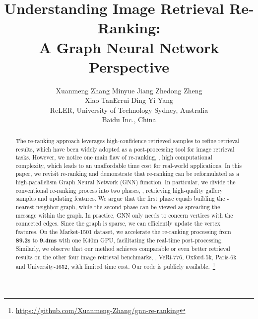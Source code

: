 \documentclass[10pt,twocolumn,letterpaper]{article}
\begin{document}
\title{Understanding Image Retrieval Re-Ranking: \\ A Graph Neural Network Perspective}



\author{
Xuanmeng Zhang \quad  Minyue Jiang \quad  Zhedong Zheng  \\
 Xiao Tan\quad Errui Ding \quad Yi Yang \quad \\ 
ReLER, University of Technology Sydney, Australia\\  
 Baidu Inc., China  \\
   


}

\maketitle


\begin{abstract}
The re-ranking approach leverages high-confidence retrieved samples to refine retrieval results, which have been widely adopted as a post-processing tool for image retrieval tasks. However, we notice one main flaw of re-ranking, \ie, high computational complexity, which leads to an unaffordable time cost for real-world applications. In this paper, we revisit re-ranking and demonstrate that re-ranking can be reformulated as a high-parallelism Graph Neural Network (GNN) function. 
In particular, we divide the conventional re-ranking process into two phases, \ie, retrieving high-quality gallery samples and updating features. We argue that the first phase equals building the -nearest neighbor graph, while the second phase can be viewed as spreading the message within the graph. In practice, GNN only needs to concern vertices with the connected edges. Since the graph is sparse, we can efficiently update the vertex features. On the Market-1501 dataset, we accelerate the re-ranking processing from \textbf{89.2s} to \textbf{9.4ms} with one K40m GPU, facilitating the real-time post-processing. Similarly, we observe that our method achieves comparable or even better retrieval results on the other four image retrieval benchmarks, \ie, VeRi-776, Oxford-5k, Paris-6k and University-1652, with limited time cost. Our code is publicly available.~\footnote{ \tiny \url{https://github.com/Xuanmeng-Zhang/gnn-re-ranking}}
\end{abstract}
\end{document}
